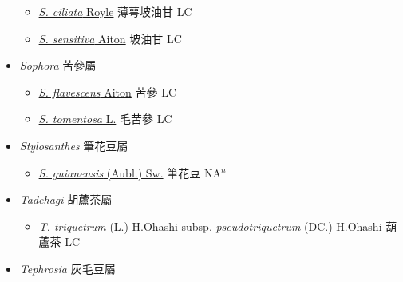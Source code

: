 \begin{itemize}
  \begin{itemize}
        \item[] \href{http://www.theplantlist.org/tpl1.1/search?q=Smithia+ciliata}{\textit{S. ciliata} Royle}   薄萼坡油甘 LC
        \item[] \href{http://www.theplantlist.org/tpl1.1/search?q=Smithia+sensitiva}{\textit{S. sensitiva} Aiton}   坡油甘 LC
  \end{itemize}
 \item[] \textit{Sophora} 苦參屬
                    
  \begin{itemize}
        \item[] \href{http://www.theplantlist.org/tpl1.1/search?q=Sophora+flavescens}{\textit{S. flavescens} Aiton}   苦參 LC
        \item[] \href{http://www.theplantlist.org/tpl1.1/search?q=Sophora+tomentosa}{\textit{S. tomentosa} L.}   毛苦參 LC
  \end{itemize}
 \item[] \textit{Stylosanthes} 筆花豆屬
                    
  \begin{itemize}
        \item[] \href{http://www.theplantlist.org/tpl1.1/search?q=Stylosanthes+guianensis}{\textit{S. guianensis} (Aubl.) Sw.}   筆花豆 NA$^n$
  \end{itemize}
 \item[] \textit{Tadehagi} 胡蘆茶屬
                    
  \begin{itemize}
        \item[] \href{http://www.theplantlist.org/tpl1.1/search?q=Tadehagi+triquetrum+subsp.+pseudotriquetrum}{\textit{T. triquetrum} (L.) H.Ohashi subsp. \textit{pseudotriquetrum} (DC.) H.Ohashi}   葫蘆茶 LC
  \end{itemize}
 \item[] \textit{Tephrosia} 灰毛豆屬
                    

\end{itemize}
